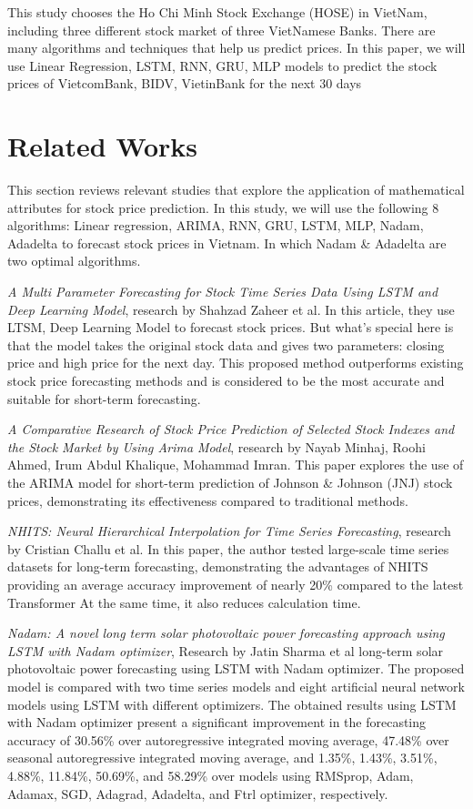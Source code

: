 \documentclass{ieeeojies}
\begin{document}
This study chooses the Ho Chi Minh Stock Exchange (HOSE) in VietNam, including three different stock market of three VietNamese Banks. There are many algorithms and techniques that help us predict prices. In this paper, we will use Linear Regression, LSTM, RNN, GRU, MLP models to predict the stock prices of VietcomBank, BIDV, VietinBank for the next 30 days \\

\section{Related Works}
This section reviews relevant studies that explore the application of mathematical attributes for stock price prediction. In this study, we will use the following 8 algorithms: Linear regression, ARIMA, RNN, GRU, LSTM, MLP, Nadam, Adadelta to forecast stock prices in Vietnam. In which Nadam \& Adadelta are two optimal algorithms.

\textit{A Multi Parameter Forecasting for Stock Time Series Data Using LSTM and Deep Learning Model}, research by Shahzad Zaheer et al. In this article, they use LTSM, Deep Learning Model to forecast stock prices. But what's special here is that the model takes the original stock data and gives two parameters: closing price and high price for the next day. This proposed method outperforms existing stock price forecasting methods and is considered to be the most accurate and suitable for short-term forecasting. \cite{b2} 

\textit{A Comparative Research of Stock Price Prediction of Selected Stock Indexes and the Stock Market by Using Arima Model}, research by Nayab Minhaj, Roohi Ahmed, Irum Abdul Khalique, Mohammad Imran. This paper explores the use of the ARIMA model for short-term prediction of Johnson \& Johnson (JNJ) stock prices, demonstrating its effectiveness compared to traditional methods. \cite{b3} 

\textit{NHITS: Neural Hierarchical Interpolation for Time Series Forecasting}, research by Cristian Challu et al. In this paper, the author tested large-scale time series datasets for long-term forecasting, demonstrating the advantages of NHITS providing an average accuracy improvement of nearly 20\% compared to the latest Transformer At the same time, it also reduces calculation time. \cite{b4} 

\textit{Nadam: A novel long term solar photovoltaic power forecasting approach using LSTM with Nadam optimizer}, Research by Jatin Sharma et al long-term solar photovoltaic power forecasting using LSTM with Nadam optimizer. The proposed model is compared with two time series models and eight artificial neural network models using LSTM with different optimizers. The obtained results using LSTM with Nadam optimizer present a significant improvement in the forecasting accuracy of 30.56\% over autoregressive integrated moving average, 47.48\% over seasonal autoregressive integrated moving average, and 1.35\%, 1.43\%, 3.51\%, 4.88\%, 11.84\%, 50.69\%, and 58.29\% over models using RMSprop, Adam, Adamax, SGD, Adagrad, Adadelta, and Ftrl optimizer, respectively. \cite{b5} 
\end{document}
